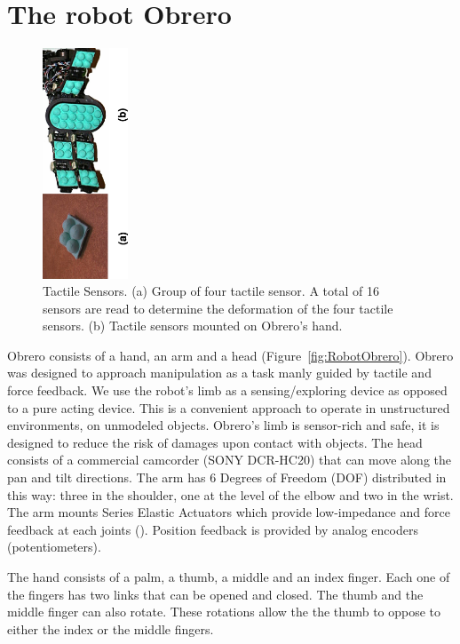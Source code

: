 
\section{The robot Obrero}
\label{sec:platform}


\begin{figure}[tbp]
\centerline{
\includegraphics[width=1.0in, angle=270 ]{./figures/Tactiles.eps}
} \caption{Tactile Sensors. (a) Group of four tactile sensor. A
total of 16 sensors are read to determine the deformation of the
four tactile sensors. (b) Tactile sensors mounted on Obrero's
hand.} \label{fig:TactileSensors}
\end{figure}

Obrero \cite{obrero} consists of a hand, an arm and a head
(Figure~\ref{fig:RobotObrero}). Obrero was designed to approach
manipulation as a task manly guided by tactile and force feedback.
We use the robot's limb as a sensing/exploring device as opposed
to a pure acting device. This is a convenient approach to operate
in unstructured environments, on unmodeled objects. Obrero's limb
is sensor-rich and safe, it is designed to reduce the risk of
damages upon contact with objects. The head consists of a
commercial camcorder (SONY DCR-HC20) that can move along the pan
and tilt directions. The arm has 6 Degrees of Freedom (DOF)
distributed in this way: three in the shoulder, one at the level of the
elbow and two in the wrist. The arm mounts Series Elastic Actuators
\cite{williamson95series} which provide low-impedance and force
feedback at each joints (\cite{AaronArm}). Position feedback is
provided by analog encoders (potentiometers).

The hand consists of a palm, a thumb, a middle and an
index finger. Each one of the fingers has two links that can be
opened and closed. The thumb and the middle finger can also
rotate. These rotations allow the the thumb to oppose to either
the index or the middle fingers.

